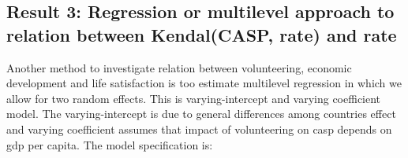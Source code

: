 \documentclass[10pt, letterpaper]{article}
\begin{document}
\begin{spacing}{1.4}
\subsection{Result 3: Regression or multilevel approach to relation between Kendal(CASP, rate) and rate }

Another method to investigate relation between volunteering, economic development and life satisfaction is too estimate multilevel regression in which we allow for two random effects. This is varying-intercept and varying coefficient model. The varying-intercept is due to general differences among countries effect and  varying coefficient assumes that impact of volunteering on casp depends on gdp per capita. The model specification is: 

%
%
%
%	 
%
%
%
%

\end{spacing}
\end{document}
